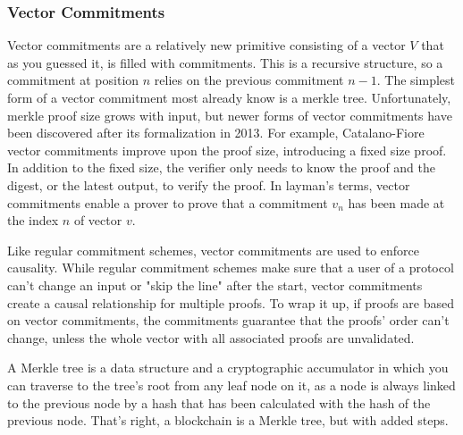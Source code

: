 \subsubsection{Vector Commitments}
Vector commitments are a relatively new primitive consisting of a vector \(V\) that as you guessed it, is filled with commitments. This is a recursive structure, so a commitment at position \(n\) relies on the previous commitment \(n-1\). The simplest form of a vector commitment most already know is a merkle tree. Unfortunately, merkle proof size grows with input, but newer forms of vector commitments have been discovered after its formalization in 2013. For example, Catalano-Fiore vector commitments improve upon the proof size, introducing a fixed size proof. In addition to the fixed size, the verifier only needs to know the proof and the digest, or the latest output, to verify the proof. In layman's terms, vector commitments enable a prover to prove that a commitment \(v_n\) has been made at the index \(n\) of vector \(v\).


Like regular commitment schemes, vector commitments are used to enforce causality. While regular commitment schemes make sure that a user of a protocol can't change an input or "skip the line" after the start, vector commitments create a causal relationship for multiple proofs. To wrap it up, if proofs are based on vector commitments, the commitments guarantee that the proofs' order can't change, unless the whole vector with all associated proofs are unvalidated.

A Merkle tree is a data structure and a cryptographic accumulator in which you can traverse to the tree's root from any leaf node on it, as a node is always linked to the previous node by a hash that has been calculated with the hash of the previous node. That's right, a blockchain is a Merkle tree, but with added steps.

